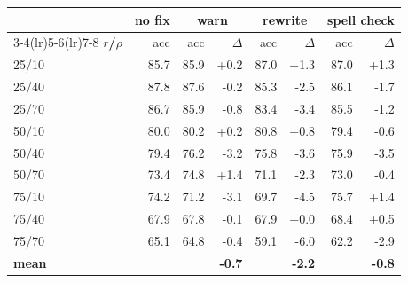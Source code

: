 \begin{tabular}{lr rr rr rr}
\toprule
& \textbf{no fix} & \multicolumn{2}{c}{\textbf{warn}} & \multicolumn{2}{c}{\textbf{rewrite}} & \multicolumn{2}{c}{\textbf{spell check}} \\
\cmidrule(lr){3-4}\cmidrule(lr){5-6}\cmidrule(lr){7-8}
\textbf{$r$/$\rho$} & acc & acc & $\Delta$ & acc & $\Delta$ & acc & $\Delta$ \\
\midrule
25/10 & 85.7 & 85.9 & +0.2 & 87.0 & +1.3 & 87.0 & +1.3 \\
25/40 & 87.8 & 87.6 & -0.2 & 85.3 & -2.5 & 86.1 & -1.7 \\
25/70 & 86.7 & 85.9 & -0.8 & 83.4 & -3.4 & 85.5 & -1.2 \\
50/10 & 80.0 & 80.2 & +0.2 & 80.8 & +0.8 & 79.4 & -0.6 \\
50/40 & 79.4 & 76.2 & -3.2 & 75.8 & -3.6 & 75.9 & -3.5 \\
50/70 & 73.4 & 74.8 & +1.4 & 71.1 & -2.3 & 73.0 & -0.4 \\
75/10 & 74.2 & 71.2 & -3.1 & 69.7 & -4.5 & 75.7 & +1.4 \\
75/40 & 67.9 & 67.8 & -0.1 & 67.9 & +0.0 & 68.4 & +0.5 \\
75/70 & 65.1 & 64.8 & -0.4 & 59.1 & -6.0 & 62.2 & -2.9 \\
\midrule \textbf{mean} & & & \textbf{-0.7} & & \textbf{-2.2} & & \textbf{-0.8} \\
\bottomrule
\end{tabular}

